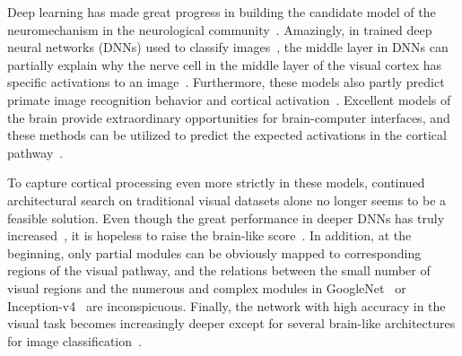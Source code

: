 \documentclass[journal]{IEEEtran}
\begin{document}
Deep learning has made great progress in building the candidate model of the neuromechanism in the neurological community~\cite{kubilius2019brain-like}. 
Amazingly, in trained deep neural networks (DNNs) used to classify images~\cite{Deng2009ImageNet}, the middle layer in DNNs can partially explain why the nerve cell in the middle layer of the visual cortex has specific activations to an image~\cite{yamins2014performance,khaligh2014deep,gucclu2015deep,murugesan2017brain,cichy2016deep,yamins2016using}. 
Furthermore, these models also partly predict primate image recognition behavior and cortical activation~\cite{rajalingham2018large,kubilius2016deep}.
Excellent models of the brain provide extraordinary opportunities for brain-computer interfaces,
and these methods can be utilized to predict the expected activations in the cortical pathway~\cite{bashivan2019neural}.


To capture cortical processing even more strictly in these models, continued architectural search on traditional visual datasets alone no longer seems to be a feasible solution. 
Even though the great performance in deeper DNNs has truly increased~\cite{ILSVRC15,luo2021trajectory}, it is hopeless to raise the brain-like score~\cite{rajalingham2018large,su2020incremental}. 
In addition, at the beginning, only partial modules can be obviously mapped to corresponding regions of the visual pathway, 
and the relations between the small number of visual regions and the numerous and complex modules in GoogleNet~\cite{szegedy2015going} or Inception-v4~\cite{szegedy2017inception} are inconspicuous. 
Finally, the network with high accuracy in the visual task becomes increasingly deeper except for several brain-like architectures for image classification~\cite{TangSchrimpfLotter2018Recurrent, kar2019evidence}. 
\end{document}
